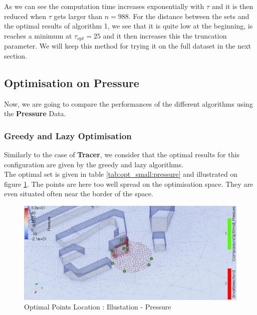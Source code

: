 As we can see the computation time increases exponentially with $\tau$ and it is then reduced when $\tau$ gets larger than $n=988$.  For the distance between the sets and the optimal results of algorithm 1, we see that it is quite low at the beginning, is reaches a minimum at $\tau_{opt} = 25$ and it then increases this the truncation parameter. We will keep this method for trying it on the full dataset in the next section. 

\subsection{Optimisation on Pressure}



Now, we are going to compare the performances of the different algorithms using the \textbf{Pressure} Data. 

\subsubsection{Greedy and Lazy Optimisation}

Similarly to the case of \textbf{Tracer}, we consider that the optimal results for this configuration are given by the greedy and lazy algorithms. \\

The optimal set is given in table \ref{tab:opt_small:pressure} and illustrated on figure \ref{fig:opt_small:pressure}. The points are here too well spread on the optimisation space. They are even situated often near the border of the space. 


\begin{figure}[h!]
\centering
    \includegraphics[width=0.8\linewidth]{figures/CompAlg/3rd/pressure_non_centered/optimal_screenshot}
    \caption{Optimal Points Location : Illustation - Pressure}
    \label{fig:opt_small:pressure}
\end{figure}

